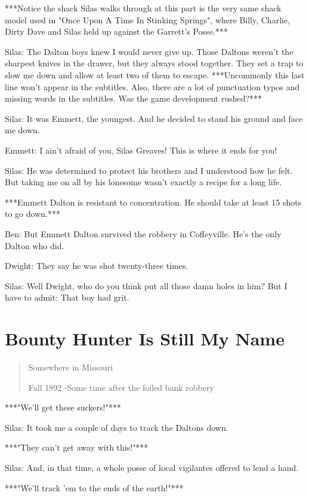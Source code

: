 \documentclass{article}
\begin{document}
***Notice the shack Silas walks through at this part is the very same shack model used in "Once Upon A Time In Stinking Springs", where Billy, Charlie, Dirty Dave and Silas held up against the Garrett's Posse.***

Silas: The Dalton boys knew I would never give up. Those Daltons weren't the sharpest knives in the drawer, but they always stood together. They set a trap to slow me down and allow at least two of them to escape. ***Uncommonly this last line won't appear in the subtitles. Also, there are a lot of punctuation typos and missing words in the subtitles. Was the game development rushed?***

Silas: It was Emmett, the youngest. And he decided to stand his ground and face me down.

Emmett: I ain't afraid of you, Silas Greaves! This is where it ends for you!

Silas: He was determined to protect his brothers and I understood how he felt. But taking me on all by his lonesome wasn't exactly a recipe for a long life.

***Emmett Dalton is resistant to concentration. He should take at least 15 shots to go down.***

Ben: But Emmett Dalton survived the robbery in Coffeyville. He's the only Dalton who did.

Dwight: They say he was shot twenty-three times.

Silas: Well Dwight, who do you think put all those damn holes in him? But I have to admit: That boy had grit.

\section*{Bounty Hunter Is Still My Name}

\begin{quote}
    Somewhere in Missouri
    
    Fall 1892 -Some time after the foiled bank robbery
\end{quote}

***"We'll get these suckers!"***

Silas: It took me a couple of days to track the Daltons down.

***"They can't get away with this!"***

Silas: And, in that time, a whole posse of local vigilantes offered to lend a hand.

***"We'll track 'em to the ends of the earth!"***
\end{document}
